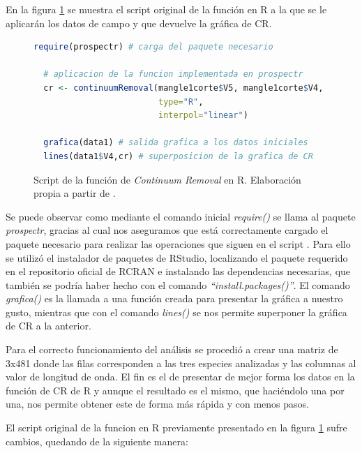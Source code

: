 En la figura \ref{fig:CR} se muestra el script original de la función en R a la que se le aplicarán los datos de campo y que devuelve la gráfica de \ac{CR}.\Sep

\begin{figure}
\centering
\begin{lstlisting}[language = R]
  require(prospectr) # carga del paquete necesario
  
  # aplicacion de la funcion implementada en prospectr 
  cr <- continuumRemoval(mangle1corte$V5, mangle1corte$V4,
                         type="R",
                         interpol="linear")
                         
  grafica(data1) # salida grafica a los datos iniciales
  lines(data1$V4,cr) # superposicion de la grafica de CR
\end{lstlisting}
\caption[Función de \textit{Continuum Removal}]{Script de la función de \textit{Continuum Removal} en R. Elaboración propia a partir de \cite{stevens2014introduction}.}
\label{fig:CR}
\end{figure}

Se puede observar como mediante el comando inicial \textit{require()} se llama al paquete \textit{prospectr}, gracias al cual nos aseguramos que está correctamente cargado el paquete necesario para realizar las operaciones que siguen en el script \citep{stevens2014introduction}. Para ello se utilizó el instalador de paquetes de RStudio, localizando el paquete requerido en el repositorio oficial de RCRAN e instalando las dependencias necesarias, que también se podría haber hecho con el comando \textit{``install.packages()''}. El comando \textit{grafica()} es la llamada a una función creada para presentar la gráfica a nuestro gusto, mientras que con el comando \textit{lines()} se nos permite superponer la gráfica de \ac{CR} a la anterior.\Sep

Para el correcto funcionamiento del análisis se procedió a crear una matriz de 3x481 donde las filas corresponden a las tres especies analizadas y las columnas al valor de longitud de onda. El fin es el de presentar de mejor forma los datos en la función de \ac{CR} de R y aunque el resultado es el mismo, que haciéndolo una por una, nos permite obtener este de forma más rápida y con menos pasos.\Sep

El script original de la funcion en R previamente presentado en la figura \ref{fig:CR} sufre cambios, quedando de la siguiente manera:\SmallSep

